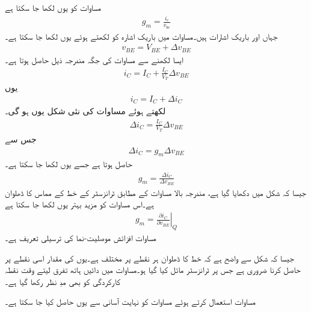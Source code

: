 
مساوات   کو یوں لکھا جا سکتا ہے
\begin{align}
g_m = \frac{i_c}{v_{be}}
\end{align}
جہاں   اور  باریک اشارات ہیں۔مساوات   میں باریک اشارہ  کو  لکھتے ہوئے یوں لکھا جا سکتا ہے۔
\begin{align}
v_{BE}=V_{BE}+\Delta v_{BE}
\end{align}
ایسا لکھنے سے مساوات   کی جگہ مندرجہ ذیل حاصل ہوتا ہے۔
\begin{align}
i_C=I_C+\frac{I_C}{V_T} \Delta v_{BE}
\end{align}
یوں
\begin{align}
i_C=I_C+\Delta i_C
\end{align}
لکھتے ہوئے مساوات   کی نئی شکل یوں ہو گی۔
\begin{align}
\Delta i_C =\frac{I_C}{V_T} \Delta v_{BE}
\end{align}
جس سے
\begin{align}
\Delta i_C = g_m \Delta v_{BE}
\end{align}
حاصل ہوتا ہے جسے یوں لکھا جا سکتا ہے۔
\begin{align}
g_m = \frac{\Delta i_C}{\Delta v_{BE}}
\end{align}
جیسا کہ شکل    میں دکھایا گیا ہے، مندرجہ بالا مساوات کے مطابق  ٹرانزسٹر کے  خط کے مماس کا ڈھلوان ہے۔اس مساوات کو مزید بہتر یوں لکھا جا سکتا ہے
\begin{align} \label{مساوات_ٹرانزسٹر_موصلیت_نما_کی_ترسیلی_تعریف}
g_m =\left . \frac{\partial i_C}{\partial v_{BE}} \right |_Q
\end{align}
مساوات   افزائش موصلیت-نما   کی ترسیلی تعریف ہے۔

جیسا کہ شکل    سے واضح ہے کہ  خط کا ڈھلوان ہر نقطے پر مختلف ہے۔یوں  کی مقدار اسی نقطے پر حاصل کرنا ضروری ہے جس پر ٹرانزسٹر مائل کیا گیا ہو۔مساوات   میں دائیں ہاتھ تفرق لیتے وقت نقطہ کارکردگی  کو بھی مدِ نظر رکھا گیا ہے۔

مساوات   استعمال کرتے ہوئے مساوات   کو نہایت آسانی سے یوں حاصل کیا جا سکتا ہے۔


